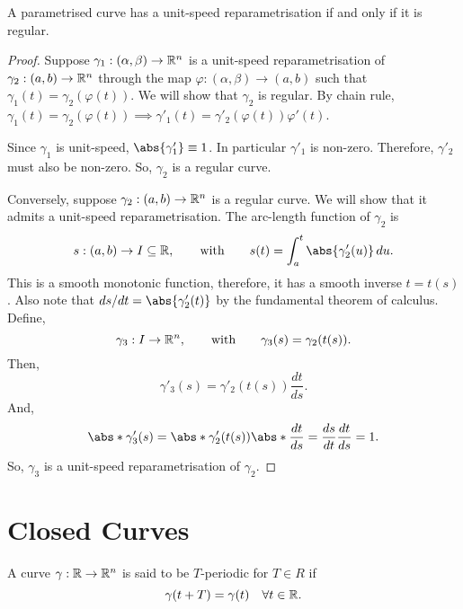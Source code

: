 \documentclass[11pt]{penrose}
\newcommand{\keyword}[1]{\textsf{#1}}
\begin{document}
\begin{nthm}
    A parametrised curve has a unit-speed reparametrisation if and only if it is regular.
\end{nthm}
\begin{proof}
    Suppose $\gamma_1 : (\alpha, \beta) \to \mathbb{R}^n$ is a unit-speed reparametrisation of $\gamma_2 : (a,b) \to \mathbb{R}^n$ through the map $\varphi : (\alpha, \beta) \to (a, b)$ such that $\gamma_1 (t) = \gamma_2 (\varphi(t))$. We will show that $\gamma_2$ is regular. By chain rule, $\gamma_1 (t) = \gamma_2 (\varphi(t)) \implies \gamma'_1 (t) = \gamma'_2 (\varphi(t)) \varphi'(t)$.

    Since $\gamma_1$ is unit-speed, $\abs{\gamma'_1} \equiv 1$. In particular $\gamma'_1$ is non-zero. Therefore, $\gamma'_2$ must also be non-zero. So, $\gamma_2$ is a regular curve.

    Conversely, suppose $\gamma_2 : (a,b) \to \mathbb{R}^n$ is a regular curve. We will show that it admits a unit-speed reparametrisation. The arc-length function of $\gamma_2$ is
    \begin{equation}
        s : (a,b) \to I \subseteq \R,
        \qquad\text{with}\qquad
        s(t) = \int_a^t \abs{\gamma'_2 (u)} \,du.
    \end{equation}
    This is a smooth monotonic function, therefore, it has a smooth inverse $t = t(s)$. Also note that $ds/dt = \abs{\gamma'_2 (t)}$ by the fundamental theorem of calculus. Define,
    \begin{equation}
        \gamma_3 : I \to \mathbb{R}^n,
        \qquad\text{with}\qquad
        \gamma_3 (s) = \gamma_2 (t(s)).
    \end{equation}
    Then,
    \begin{equation}
        \gamma'_3 (s) = \gamma'_2 (t(s)) \frac{dt}{ds}.
    \end{equation}
    And,
    \begin{equation}
        \abs*{\gamma'_3 (s)}
        = \abs*{\gamma'_2 (t(s))} \abs*{\frac{dt}{ds}}
        = \frac{ds}{dt} \frac{dt}{ds}
        = 1.
    \end{equation}
    So, $\gamma_3$ is a unit-speed reparametrisation of $\gamma_2$.
\end{proof}

\section{Closed Curves}
\begin{ndfn}
    A curve $\gamma : \mathbb{R} \to \mathbb{R}^n$ is said to be \keyword{$T$-periodic} for $T \in R$ if
    \begin{equation}
        \gamma(t + T) = \gamma(t)
        \quad\forall t \in \mathbb{R}.
    \end{equation}
\end{ndfn}
\end{document}

